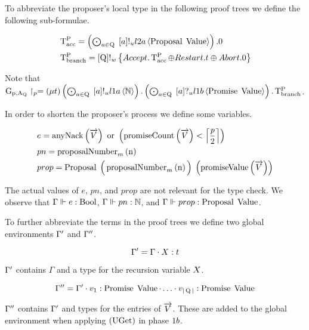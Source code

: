 To abbreviate the proposer's local type in the following proof trees we define the following sub-formulae.

\begin{align*}
&\operatorname{T^{P}_{acc}} = \textstyle\left(\bigodot_{a\in\operatorname{Q}}\;\left[a\right]!_u l2a \left\langle \operatorname{Proposal}\; \operatorname{Value} \right\rangle\right).0\\
&\operatorname{T^{P}_{branch}} = \left[\operatorname{Q}\right]!_w \left\{\mathnormal{Accept} . \operatorname{T^{P}_{acc}} \oplus \mathnormal{Restart} . t \oplus \mathnormal{Abort} .0\right\}
\end{align*}

Note that $\operatorname{G_{p, A_Q}} \upharpoonright_{p} = \left(\mu t\right)
\textstyle\left(\bigodot_{a\in\operatorname{Q}}\;\left[a\right]!_u l1a \left\langle \mathbb{N} \right\rangle\right) .
\textstyle\left(\bigodot_{a\in\operatorname{Q}}\;\left[a\right]?_u l1b \left\langle \operatorname{Promise}\; \operatorname{Value} \right\rangle\right) . \operatorname{T^{P}_{branch}}$.

In order to shorten the proposer's process we define some variables.

\begin{align*}
&e = \operatorname{anyNack}\left(\overrightarrow{V}\right) \text{ or } \left(\operatorname{promiseCount}\left(\overrightarrow{V}\right) < \Big\lceil \frac{p}{2} \Big\rceil\right)\\
&pn = \operatorname{proposalNumber}_m\left( \operatorname{n}\right)\\
&prop = \operatorname{Proposal}\; \Big ( \operatorname{proposalNumber}_m\left( \operatorname{n}\right) \Big )\; \left(\operatorname{promiseValue}\left(\overrightarrow{V}\right)\right)
\end{align*}

The actual values of $e$, $pn$, and $prop$ are not relevant for the type check.
We observe that $\Gamma\Vdash e:\operatorname{Bool}$, $\Gamma\Vdash pn:\mathbb{N}$, and $\Gamma\Vdash prop:\operatorname{Proposal}\; \operatorname{Value}$.

To further abbreviate the terms in the proof trees we define two global environments $\Gamma'$ and $\Gamma''$.

\[\Gamma'=\Gamma\cdot X:t\]

$\Gamma'$ contains $\Gamma$ and a type for the recursion variable $X$.

\[\Gamma'' = \Gamma' \cdot v_{1}:\operatorname{Promise}\; \operatorname{Value}\cdot\ldots\cdot v_{|\operatorname{Q}|}:\operatorname{Promise}\; \operatorname{Value}\]

$\Gamma''$ contains $\Gamma'$ and types for the entries of $\overrightarrow{V}$.
These are added to the global environment when applying $\left(\operatorname{UGet}\right)$ in phase $1b$.

